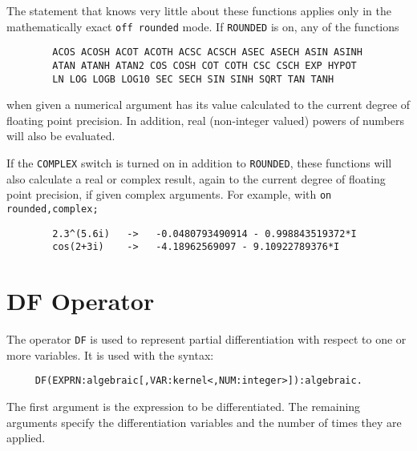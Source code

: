 The statement that {\REDUCE} knows very little about these functions
applies only in the mathematically exact {\tt off rounded} mode.  If
{\tt ROUNDED} is on, any of the functions
\begin{verbatim}
        ACOS ACOSH ACOT ACOTH ACSC ACSCH ASEC ASECH ASIN ASINH
        ATAN ATANH ATAN2 COS COSH COT COTH CSC CSCH EXP HYPOT
        LN LOG LOGB LOG10 SEC SECH SIN SINH SQRT TAN TANH
\end{verbatim}
when given a numerical argument has its value calculated to the current
degree of floating point precision.  In addition, real (non-integer
valued) powers of numbers will also be evaluated.

If the {\tt COMPLEX} switch is turned on in addition to {\tt ROUNDED},
these functions will also calculate a real or complex result, again to
the current degree of floating point precision,
if given complex arguments.  For example, with {\tt on rounded,complex;}
\begin{verbatim}
        2.3^(5.6i)   ->   -0.0480793490914 - 0.998843519372*I
        cos(2+3i)    ->   -4.18962569097 - 9.10922789376*I
\end{verbatim}

\section{DF Operator}
The operator {\tt DF} is used to represent partial
differentiation with respect
to one or more variables. It is used with the syntax:
\begin{verbatim}
     DF(EXPRN:algebraic[,VAR:kernel<,NUM:integer>]):algebraic.
\end{verbatim}
The first argument is the expression to be differentiated. The remaining
arguments specify the differentiation variables and the number of times
they are applied.

